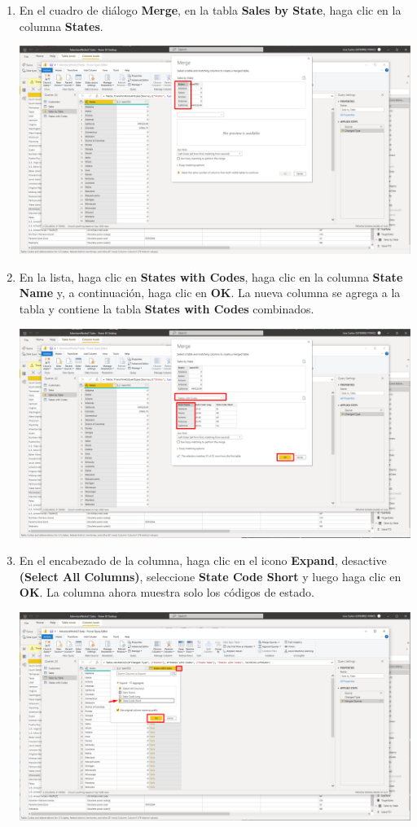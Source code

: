 \documentclass[12pt,letterpaper]{article}
\newcommand\tab[1][1cm]{\hspace*{#1}}
\begin{document}
\begin{enumerate}[\tab 1.]
\begin{center}
        \end{center}
        \item En el cuadro de diálogo \textbf{Merge}, en la tabla \textbf{Sales by State}, haga clic en la columna \textbf{States}.
        \begin{center}
            \includegraphics[width=13cm]{./img/img71.png}
        \end{center}
        \item En la lista, haga clic en \textbf{States with Codes}, haga clic en la columna \textbf{State Name} y, a continuación, haga clic en \textbf{OK}. La nueva columna se agrega a la tabla y contiene la tabla \textbf{States with Codes} combinados.
        \begin{center}
            \includegraphics[width=13cm]{./img/img72.png}
        \end{center}
        \item En el encabezado de la columna, haga clic en el icono \textbf{Expand}, desactive \textbf{(Select All Columns)}, seleccione \textbf{State Code Short} y luego haga clic en \textbf{OK}. La columna ahora muestra solo los códigos de estado.
        \begin{center}
            \includegraphics[width=13cm]{./img/img73.png}

\end{center}
\end{enumerate}
\end{document}
